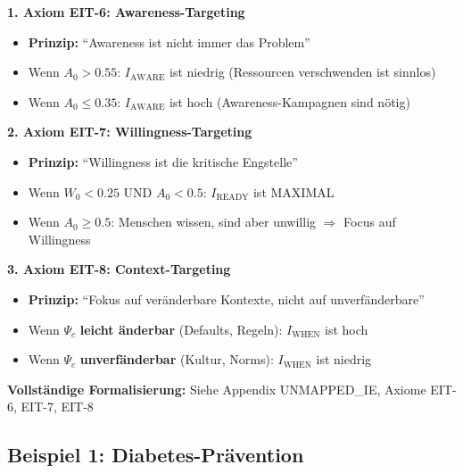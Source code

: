 \begin{tcolorbox}[colback=green!5!white, colframe=green!75!black,
    title=\textbf{Die drei Kernfunktionen der Intervention-Emergenz}]

\textbf{1. Axiom EIT-6: Awareness-Targeting}
\begin{itemize}[nosep]
\item \textbf{Prinzip:} ``Awareness ist nicht immer das Problem''
\item Wenn $A_0 > 0.55$: $I_{\text{AWARE}}$ ist niedrig (Ressourcen verschwenden ist sinnlos)
\item Wenn $A_0 \leq 0.35$: $I_{\text{AWARE}}$ ist hoch (Awareness-Kampagnen sind n\"{o}tig)
\end{itemize}

\textbf{2. Axiom EIT-7: Willingness-Targeting}
\begin{itemize}[nosep]
\item \textbf{Prinzip:} ``Willingness ist die kritische Engstelle''
\item Wenn $W_0 < 0.25$ UND $A_0 < 0.5$: $I_{\text{READY}}$ ist MAXIMAL
\item Wenn $A_0 \geq 0.5$: Menschen wissen, sind aber unwillig $\Rightarrow$ Focus auf Willingness
\end{itemize}

\textbf{3. Axiom EIT-8: Context-Targeting}
\begin{itemize}[nosep]
\item \textbf{Prinzip:} ``Fokus auf ver\"{a}nderbare Kontexte, nicht auf unverf\"{a}nderbare''
\item Wenn $\Psi_c$ \textbf{leicht \"{a}nderbar} (Defaults, Regeln): $I_{\text{WHEN}}$ ist hoch
\item Wenn $\Psi_c$ \textbf{unverf\"{a}nderbar} (Kultur, Norms): $I_{\text{WHEN}}$ ist niedrig
\end{itemize}

\vspace{0.3cm}
\textbf{Vollständige Formalisierung:} Siehe Appendix UNMAPPED_IE, Axiome EIT-6, EIT-7, EIT-8

\end{tcolorbox}

\subsection{Beispiel 1: Diabetes-Pr\"{a}vention}
\label{sec:17-example-diabetes}

